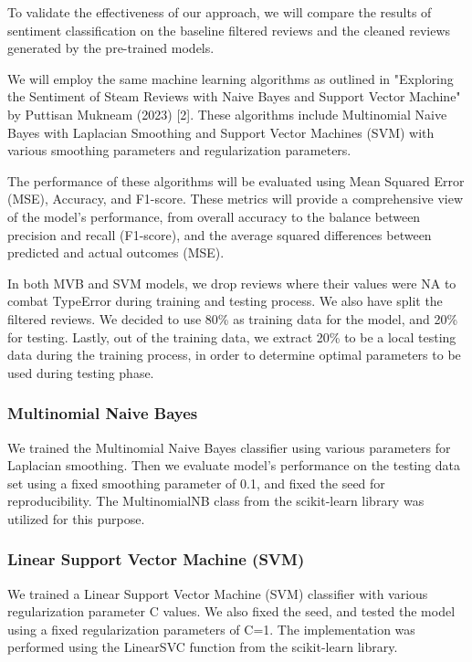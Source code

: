 \documentclass{article}
\begin{document}
To validate the effectiveness of our approach, we will compare the results of sentiment classification on the baseline filtered reviews and the cleaned reviews generated by the pre-trained models.

We will employ the same machine learning algorithms as outlined in "Exploring the Sentiment of Steam Reviews with Naive Bayes and Support Vector Machine" by Puttisan Mukneam (2023) [2]. These algorithms include Multinomial Naive Bayes with Laplacian Smoothing and Support Vector Machines (SVM) with various smoothing parameters and regularization parameters.

The performance of these algorithms will be evaluated using Mean Squared Error (MSE), Accuracy, and F1-score. These metrics will provide a comprehensive view of the model's performance, from overall accuracy to the balance between precision and recall (F1-score), and the average squared differences between predicted and actual outcomes (MSE).

In both MVB and SVM models, we drop reviews where their values were NA to combat TypeError during training and testing process. We also have split the filtered reviews. We decided to use 80\% as training data for the model, and 20\% for testing. Lastly, out of the training data, we extract 20\% to be a local testing data during the training process, in order to determine optimal parameters to be used during testing phase.

\subsubsection{Multinomial Naive Bayes}

We trained the Multinomial Naive Bayes classifier using various parameters for Laplacian smoothing. Then we evaluate model's performance on the testing data set using a fixed smoothing parameter of 0.1, and fixed the seed for reproducibility. The MultinomialNB class from the scikit-learn library was utilized for this purpose. 

\subsubsection{Linear Support Vector Machine (SVM)}

We trained a Linear Support Vector Machine (SVM) classifier with various regularization parameter C values. We also fixed the seed, and tested the model using a fixed regularization parameters of C=1. The implementation was performed using the LinearSVC function from the scikit-learn library.
\end{document}
